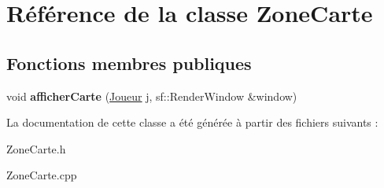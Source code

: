 \hypertarget{classZoneCarte}{\section{\-Référence de la classe \-Zone\-Carte}
\label{classZoneCarte}
}
\subsection*{\-Fonctions membres publiques}
\begin{DoxyCompactItemize}
\item 
\hypertarget{classZoneCarte_ae60d85f22bb2dea8e632e947e22c1f79}{void {\bfseries afficher\-Carte} (\hyperlink{classJoueur}{\-Joueur} j, sf\-::\-Render\-Window \&window)}\label{classZoneCarte_ae60d85f22bb2dea8e632e947e22c1f79}

\end{DoxyCompactItemize}


\-La documentation de cette classe a été générée à partir des fichiers suivants \-:\begin{DoxyCompactItemize}
\item 
\-Zone\-Carte.\-h\item 
\-Zone\-Carte.\-cpp\end{DoxyCompactItemize}
